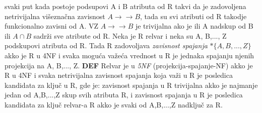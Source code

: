 \documentclass{article}
\begin{document}
svaki put kada postoje podsupovi A i B atributa od R takvi da
je zadovoljena netrivijalna višeznačna zavisnost 
$A \rightarrow\rightarrow B$, tada su svi atributi od R
takodje funkcionalno zavisni od A.
\newline
VZ $A \rightarrow\rightarrow B$ je
trivijalna ako je ili A nadskup od B ili $A \cap B$ sadrži
sve atribute od R.
\newline
Neka je R relvar i neka su A, B,..., Z podskupovi atributa od
R. Tada R zadovoljava \textit{zavisnost spajanja}
$*\{A,B,...,Z\}$ akko je R u 4NF i svaka moguća važeća
vrednost u R je jednaka spajanju njenih projekcija na A,
B,..., Z.
\vspace{0.2cm}\newline
\textbf{DEF} Relvar je u \textit{5NF}
(projekcija-spajanje-NF) akko je R u 4NF i svaka netrivijalna
zavisnost spajanja koja važi u R je posledica kandidata za
ključ u R, gde je: zavisnost spajanja u R trivijalna akko je
najmanje jedan od A,B,...,Z skup svih atributa R, i zavisnost
spajanja u R je posledica kandidata za ključ relvar-a R akko
je svaki od A,B,...,Z nadključ za R.
\end{document}
